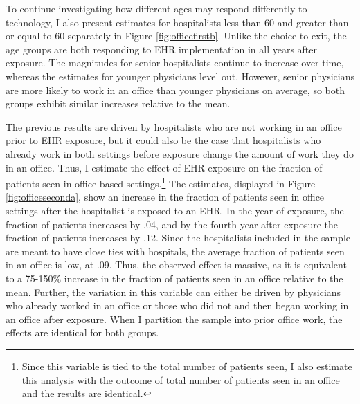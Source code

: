 \documentclass[12pt]{article}
\begin{document}
To continue investigating how different ages may respond differently to technology, I also present estimates for hospitalists less than 60 and greater than or equal to 60 separately in Figure \ref{fig:officefirstb}. Unlike the choice to exit, the age groups are both responding to EHR implementation in all years after exposure. The magnitudes for senior hospitalists continue to increase over time, whereas the estimates for younger physicians level out. However, senior physicians are more likely to work in an office than younger physicians on average, so both groups exhibit similar increases relative to the mean. 

The previous results are driven by hospitalists who are not working in an office prior to EHR exposure, but it could also be the case that hospitalists who already work in both settings before exposure change the amount of work they do in an office. Thus, I estimate the effect of EHR exposure on the fraction of patients seen in office based settings.\footnote{Since this variable is tied to the total number of patients seen, I also estimate this analysis with the outcome of total number of patients seen in an office and the results are identical.} The estimates, displayed in Figure \ref{fig:officeseconda}, show an increase in the fraction of patients seen in office settings after the hospitalist is exposed to an EHR. In the year of exposure, the fraction of patients increases by .04, and by the fourth year after exposure the fraction of patients increases by .12. Since the hospitalists included in the sample are meant to have close ties with hospitals, the average fraction of patients seen in an office is low, at .09. Thus, the observed effect is massive, as it is equivalent to a 75-150\% increase in the fraction of patients seen in an office relative to the mean. Further, the variation in this variable can either be driven by physicians who already worked in an office or those who did not and then began working in an office after exposure. When I partition the sample into prior office work, the effects are identical for both groups. 
\end{document}
